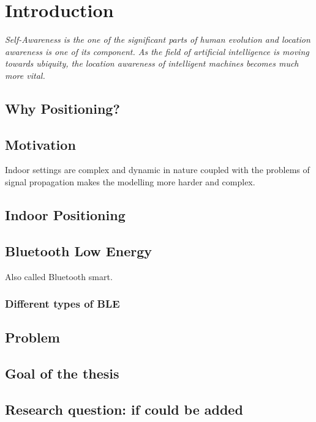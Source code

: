 \chapter{Introduction}

\begin{center}
\textit{Self-Awareness is the one of the significant parts of human evolution and location awareness is one of its component. As the field of artificial intelligence is moving towards ubiquity, the location awareness of intelligent machines becomes much more vital.}
\end{center}

\section{Why Positioning?}

\section{Motivation}

Indoor settings are complex and dynamic in nature coupled with the problems of signal propagation makes the modelling more harder and complex. 

\section{Indoor Positioning}

\section{Bluetooth Low Energy}

Also called Bluetooth smart.

\subsection{Different types of BLE}

\section{Problem}

\section{Goal of the thesis}

\section{Research question: if could be added}

